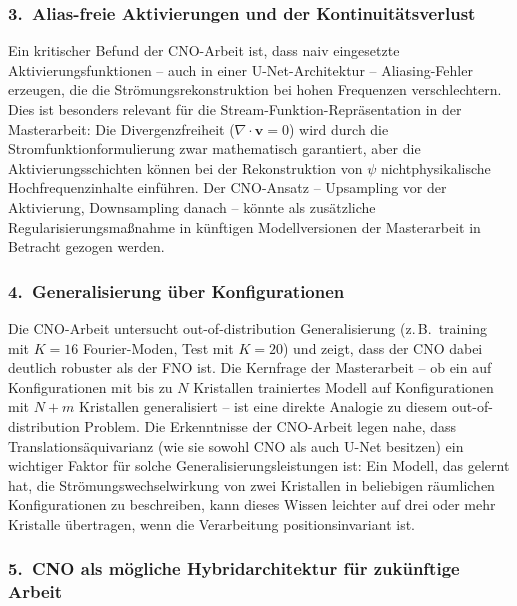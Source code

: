 \documentclass[a4paper,12pt]{article}
\begin{document}
\subsubsection*{3.\ Alias-freie Aktivierungen und der Kontinuit\"atsverlust}

Ein kritischer Befund der CNO-Arbeit ist, dass naiv eingesetzte Aktivierungsfunktionen -- auch in einer U-Net-Architektur -- Aliasing-Fehler
erzeugen, die die Str\"omungsrekonstruktion bei hohen Frequenzen verschlechtern.
Dies ist besonders relevant f\"ur die Stream-Funktion-Repr\"asentation in der
Masterarbeit: Die Divergenzfreiheit ($\nabla \cdot \mathbf{v} = 0$) wird durch
die Stromfunktionformulierung zwar mathematisch garantiert, aber die Aktivierungsschichten k\"onnen bei der Rekonstruktion von $\psi$ nichtphysikalische
Hochfrequenzinhalte einf\"uhren. Der CNO-Ansatz -- Upsampling vor der
Aktivierung, Downsampling danach -- k\"onnte als zus\"atzliche Regularisierungsma\ss nahme in k\"unftigen Modellversionen der Masterarbeit in Betracht
gezogen werden.

\subsubsection*{4.\ Generalisierung \"uber Konfigurationen}

Die CNO-Arbeit untersucht out-of-distribution Generalisierung (z.\,B.\ training
mit $K{=}16$ Fourier-Moden, Test mit $K{=}20$) und zeigt, dass der CNO dabei
deutlich robuster als der FNO ist. Die Kernfrage der Masterarbeit -- ob ein auf
Konfigurationen mit bis zu $N$ Kristallen trainiertes Modell auf Konfigurationen
mit $N + m$ Kristallen generalisiert -- ist eine direkte Analogie zu diesem
out-of-distribution Problem. Die Erkenntnisse der CNO-Arbeit legen nahe, dass
Translationsäquivarianz (wie sie sowohl CNO als auch U-Net besitzen) ein
wichtiger Faktor f\"ur solche Generalisierungsleistungen ist: Ein Modell, das
gelernt hat, die Str\"omungswechselwirkung von zwei Kristallen in beliebigen
r\"aumlichen Konfigurationen zu beschreiben, kann dieses Wissen leichter
auf drei oder mehr Kristalle \"ubertragen, wenn die Verarbeitung
positionsinvariant ist.

\subsubsection*{5.\ CNO als m\"ogliche Hybridarchitektur f\"ur zuk\"unftige Arbeit}
\end{document}
